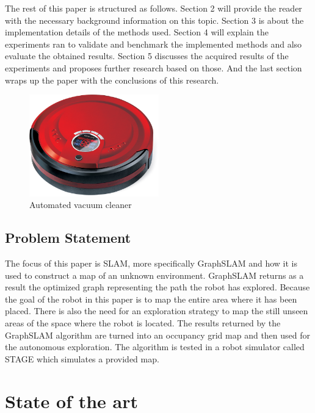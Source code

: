 \documentclass{ba-kecs}
\begin{document}
The rest of this paper is structured as follows. Section 2 will provide the reader with the necessary background information on this topic. Section 3 is about the implementation details of the methods used. Section 4 will explain the experiments ran to validate and benchmark the implemented methods and also evaluate the obtained results. Section 5 discusses the acquired results of the experiments and proposes further research based on those. And the last section wraps up the paper with the conclusions of this research.

\begin{figure}[htp]
	\centering
		\includegraphics[width=0.50\textwidth]{figures/vacuum_cleaner.jpg}
	\caption{Automated vacuum cleaner}
	\label{fig:vacuum_cleaner}
\end{figure}

\subsection{Problem Statement}
The focus of this paper is SLAM, more specifically GraphSLAM and how it is used to construct a map of an unknown environment. GraphSLAM returns as a result the optimized graph representing the path the robot has explored. Because the goal of the robot in this paper is to map the entire area where it has been placed. There is also the need for an exploration strategy to map the still unseen areas of the space where the robot is located. The results returned by the GraphSLAM algorithm are turned into an occupancy grid map and then used for the autonomous exploration. The algorithm is tested in a robot simulator called STAGE which simulates a provided map.

\section{State of the art}
\end{document}
